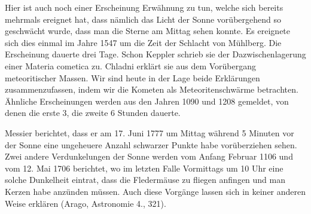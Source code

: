 \documentclass[a4paper, 11pt, oneside, german]{article}
\begin{document}
Hier ist auch noch einer Erscheinung Erwähnung zu tun, welche sich bereits mehrmals ereignet hat, dass nämlich das Licht der Sonne vorübergehend so geschwächt wurde, dass man die Sterne am Mittag sehen konnte. Es ereignete sich dies einmal im Jahre 1547 um die Zeit der Schlacht von Mühlberg. Die Erscheinung dauerte drei Tage. Schon Keppler schrieb sie der Dazwischenlagerung einer Materia cometica zu. Chladni erklärt sie aus dem Vorübergang meteoritischer Massen. Wir sind heute in der Lage beide Erklärungen zusammenzufassen, indem wir die Kometen als Meteoritenschwärme betrachten.  Ähnliche Erscheinungen werden aus den Jahren 1090 und 1208 gemeldet, von denen die erste 3, die zweite 6 Stunden dauerte.

Messier berichtet, dass er am 17. Juni 1777 um Mittag während 5 Minuten vor der Sonne eine ungeheuere Anzahl schwarzer Punkte habe vorüberziehen sehen. Zwei andere Verdunkelungen der Sonne werden vom Anfang Februar 1106 und vom 12. Mai 1706 berichtet, wo im letzten Falle Vormittags um 10 Uhr eine solche Dunkelheit eintrat, dass die Fledermäuse zu fliegen anfingen und man Kerzen habe anzünden müssen. Auch diese Vorgänge lassen sich in keiner anderen Weise erklären (Arago, Astronomie 4., 321).
\clearpage
\end{document}

